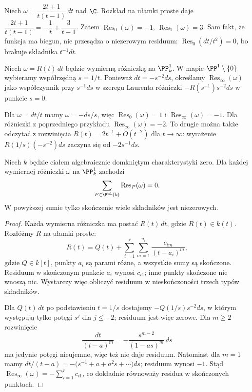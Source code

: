 \begin{przyklad}
Niech $\omega=\dfrac{2t+1}{t(t-1)}\,dt$ nad $\C$.
Rozkład na ułamki proste daje
$\dfrac{2t+1}{t(t-1)}=-\dfrac1t+\dfrac3{t-1}$.
Zatem $\operatorname{Res}_0(\omega)=-1$,
$\operatorname{Res}_1(\omega)=3$.
Sam fakt, że funkcja ma biegun, nie przesądza o niezerowym residuum:
$\operatorname{Res}_0(dt/t^2)=0$, bo brakuje składnika $t^{-1}dt$.
\end{przyklad}

\begin{definicja}
Niech $\omega=R(t)\,dt$ będzie wymierną różniczką
na $\PP^1_k$. W mapie $\PP^1\setminus\{0\}$ wybieramy
współrzędną $s=1/t$. Ponieważ $dt=-s^{-2}ds$,
określamy
$\operatorname{Res}_{\infty}(\omega)$ jako współczynnik
przy $s^{-1}ds$ w szeregu Laurenta różniczki
$-R(s^{-1})s^{-2}ds$ w punkcie $s=0$.
\end{definicja}

\begin{przyklad}
Dla $\omega=dt/t$ mamy $\omega=-ds/s$, więc
$\operatorname{Res}_0(\omega)=1$ i
$\operatorname{Res}_{\infty}(\omega)=-1$.
Dla różniczki z poprzedniego przykładu
$\operatorname{Res}_{\infty}(\omega)=-2$.
To drugie można także odczytać z rozwinięcia
$R(t)=2t^{-1}+O(t^{-2})$ dla $t\to\infty$:
wyrażenie $R(1/s)(-s^{-2})ds$ zaczyna się od
$-2s^{-1}ds$.
\end{przyklad}

\begin{twierdzenie}
\label{tw:sum-res-p1}
Niech $k$ będzie ciałem algebraicznie domkniętym charakterystyki
zero. Dla każdej wymiernej różniczki $\omega$ na
$\PP^1_k$ zachodzi
\[
 \sum_{P\in\PP^1(k)}\operatorname{Res}_{P}(\omega)=0.
\]
W powyższej sumie tylko skończenie wiele składników jest niezerowych.
\end{twierdzenie}
\begin{proof}
Każda wymierna różniczka ma postać $R(t)\,dt$, gdzie
$R(t)\in k(t)$. Rozłóżmy $R$ na ułamki proste:
\[
 R(t)=Q(t)+\sum_{i=1}^{r}\sum_{m=1}^{n_i}
 \frac{c_{im}}{(t-a_i)^m},
\]
gdzie $Q\in k[t]$, punkty $a_i$ są parami różne,
a wszystkie sumy są skończone. Residuum w skończonym
punkcie $a_i$ wynosi $c_{i1}$; inne punkty skończone
nie wnoszą nic. Wystarczy więc obliczyć residuum w nieskończoności
trzech typów składników.

Dla $Q(t)\,dt$ po podstawieniu $t=1/s$ dostajemy
$-Q(1/s)s^{-2}ds$, w którym występują tylko potęgi
$s^j$ dla $j\le-2$; residuum jest więc zerowe.
Dla $m\ge2$ rozwinięcie
\[
 \frac{dt}{(t-a)^m}
 =-\frac{s^{m-2}}{(1-as)^m}\,ds
\]
ma jedynie potęgi nieujemne, więc też nie daje residuum.
Natomiast dla $m=1$ mamy
$dt/(t-a)=-\bigl(s^{-1}+a+a^2s+\cdots\bigr)ds$;
residuum wynosi $-1$. Stąd
$\operatorname{Res}_\infty(\omega)=-\sum_{i=1}^r c_{i1}$,
co dokładnie równoważy residua w skończonych punktach.
\end{proof}

